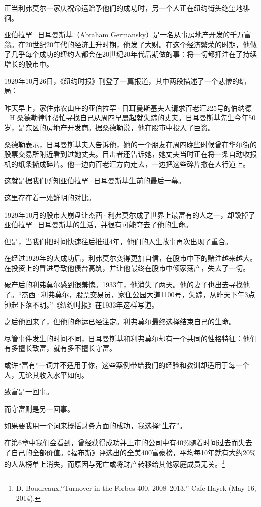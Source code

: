 正当利弗莫尔一家庆祝命运赠予他们的成功时，另一个人正在纽约街头绝望地徘徊。

亚伯拉罕·日耳曼斯基（Abraham Germansky）是一名从事房地产开发的千万富翁。在20世纪20年代的经济上升时期，他发了大财。在这个经济繁荣的时期，他做了几乎每个成功的纽约人都会在20世纪20年代后期做的事：将一切都押注在了持续增长的股市中。

1929年10月26日，《纽约时报》刊登了一篇报道，其中两段描述了一个悲惨的结局：

{\kaishu

昨天早上，家住弗农山庄的亚伯拉罕·日耳曼斯基夫人请求百老汇225号的伯纳德·H.桑德勒律师帮忙寻找自己从周四早晨起就失踪的丈夫。日耳曼斯基先生今年50岁，是东区的房地产开发商。据桑德勒说，他在股市中投入了巨资。

桑德勒表示，日耳曼斯基夫人告诉他，她的一个朋友在周四晚些时候曾在华尔街的股票交易所附近看到过她丈夫。目击者还告诉她，她丈夫当时正在将一条自动收报机的纸条撕成碎片。他一边向百老汇方向走去，一边把这些碎片撒在人行道上。

}

这就是据我们所知亚伯拉罕·日耳曼斯基生前的最后一幕。

这里存在着一处鲜明的对比。

1929年10月的股市大崩盘让杰西·利弗莫尔成了世界上最富有的人之一，却毁掉了亚伯拉罕·日耳曼斯基的生活，并很有可能夺去了他的生命。

但是，当我们把时间快速往后推进4年，他们的人生故事再次出现了重合。

在经过1929年的大成功后，利弗莫尔变得更加自信，在股市中下的赌注越来越大。在投资上的冒进导致他债台高筑，并让他最终在股市中倾家荡产，失去了一切。

破产后的利弗莫尔感到很羞愧。1933年，他消失了两天。他的妻子也出去寻找他了。“杰西·利弗莫尔，股票交易员，家住公园大道1100号，失踪，从昨天下午3点钟起下落不明。”《纽约时报》在1933年这样写道。

之后他回来了，但他的命运已经注定。利弗莫尔最终选择结束自己的生命。

尽管事件发生的时间不同，日耳曼斯基和利弗莫尔却有一个共同的性格特征：他们有多擅长致富，就有多不擅长守富。

或许“富有”一词并不适用于你，这些案例带给我们的经验和教训却适用于每一个人，无论其收入水平如何。

致富是一回事。

而守富则是另一回事。

如果要我用一个词来概括财务方面的成功，我选择“生存”。

在第6章中我们会看到，曾经获得成功并上市的公司中有40\%随着时间过去而失去了自己的全部价值。《福布斯》评选出的全美400富豪榜，平均每10年就有大约20\%的人从榜单上消失，而原因与死亡或将财产转移给其他家庭成员无关。\footnote{D. Boudreaux,“Turnover in the Forbes 400, 2008–2013,” Cafe Hayek (May 16, 2014).}

